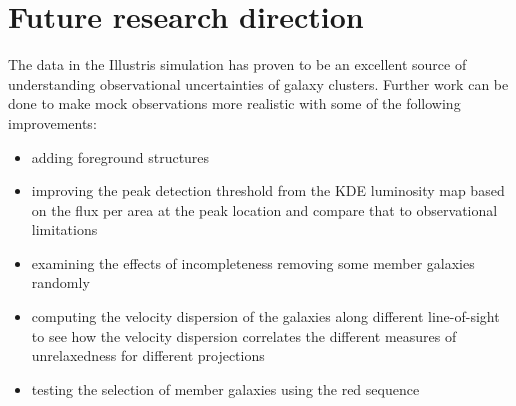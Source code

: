 \section{Future research direction}
The data in the Illustris simulation has proven to be an excellent source of
understanding observational uncertainties of galaxy clusters.
Further work can be done to make mock observations more realistic with some of
the following improvements:
\begin{itemize}
		\item adding foreground structures 
		\item improving the peak detection threshold from the KDE luminosity map based on
			the flux per area at the peak location and compare that to observational
			limitations
		\item examining the effects of incompleteness removing some member galaxies randomly 
		\item computing the velocity dispersion of the galaxies along different
			line-of-sight to see how the velocity dispersion correlates the different
			measures of unrelaxedness for different projections
		\item testing the selection of member galaxies using the red sequence
	\end{itemize}


